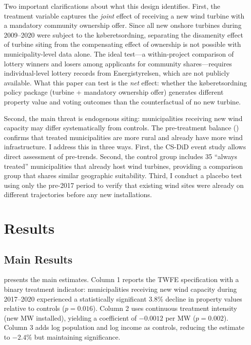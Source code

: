 \documentclass[12pt]{article}
\begin{document}
Two important clarifications about what this design identifies. First, the treatment variable captures the \textit{joint} effect of receiving a new wind turbine with a mandatory community ownership offer. Since all new onshore turbines during 2009--2020 were subject to the k{\o}beretsordning, separating the disamenity effect of turbine siting from the compensating effect of ownership is not possible with municipality-level data alone. The ideal test---a within-project comparison of lottery winners and losers among applicants for community shares---requires individual-level lottery records from Energistyrelsen, which are not publicly available. What this paper can test is the \textit{net} effect: whether the k{\o}beretsordning policy package (turbine + mandatory ownership offer) generates different property value and voting outcomes than the counterfactual of no new turbine.

Second, the main threat is endogenous siting: municipalities receiving new wind capacity may differ systematically from controls. The pre-treatment balance () confirms that treated municipalities are more rural and already have more wind infrastructure. I address this in three ways. First, the CS-DiD event study allows direct assessment of pre-trends. Second, the control group includes 35 ``always treated'' municipalities that already host wind turbines, providing a comparison group that shares similar geographic suitability. Third, I conduct a placebo test using only the pre-2017 period to verify that existing wind sites were already on different trajectories before any new installations.


\section{Results}

\subsection{Main Results}

 presents the main estimates. Column 1 reports the TWFE specification with a binary treatment indicator: municipalities receiving new wind capacity during 2017--2020 experienced a statistically significant 3.8\% decline in property values relative to controls ($p = 0.016$). Column 2 uses continuous treatment intensity (new MW installed), yielding a coefficient of $-0.0012$ per MW ($p = 0.002$). Column 3 adds log population and log income as controls, reducing the estimate to $-2.4\%$ but maintaining significance.
\end{document}
